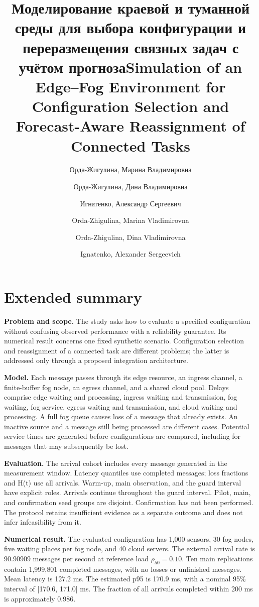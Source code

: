 \documentclass{psta}
\title[Моделирование краевой и туманной среды]{Моделирование краевой и туманной среды для выбора конфигурации и переразмещения связных задач с учётом прогноза}
\author{Орда-Жигулина, Марина Владимировна}
\author{Орда-Жигулина, Дина Владимировна}
\author{Игнатенко, Александр Сергеевич}
\title[Edge--fog simulation and reassignment]{Simulation of an Edge--Fog Environment for Configuration Selection and Forecast-Aware Reassignment of Connected Tasks}
\author{Orda-Zhigulina, Marina Vladimirovna}
\author{Orda-Zhigulina, Dina Vladimirovna}
\author{Ignatenko, Alexander Sergeevich}
\begin{document}
\Russian\maketitle

\raggedbottom
\clearpage\Russian\makeauthorsinfo
\English\maketitle\section*{Extended summary}
\textbf{Problem and scope.} The study asks how to evaluate a specified configuration without confusing observed performance with a reliability guarantee. Its numerical result concerns one fixed synthetic scenario. Configuration selection and reassignment of a connected task are different problems; the latter is addressed only through a proposed integration architecture.

\textbf{Model.} Each message passes through its edge resource, an ingress channel, a finite-buffer fog node, an egress channel, and a shared cloud pool. Delays comprise edge waiting and processing, ingress waiting and transmission, fog waiting, fog service, egress waiting and transmission, and cloud waiting and processing. A full fog queue causes loss of a message that already exists. An inactive source and a message still being processed are different cases. Potential service times are generated before configurations are compared, including for messages that may subsequently be lost.

\textbf{Evaluation.} The arrival cohort includes every message generated in the measurement window. Latency quantiles use completed messages; loss fractions and H(t) use all arrivals. Warm-up, main observation, and the guard interval have explicit roles. Arrivals continue throughout the guard interval. Pilot, main, and confirmation seed groups are disjoint. Confirmation has not been performed. The protocol retains insufficient evidence as a separate outcome and does not infer infeasibility from it.

\textbf{Numerical result.} The evaluated configuration has 1,000 sensors, 30 fog nodes, five waiting places per fog node, and 40 cloud servers. The external arrival rate is 90.90909 messages per second at reference load \(\rho_{50}=0.10\). Ten main replications contain 1,999,801 completed messages, with no losses or unfinished messages. Mean latency is 127.2 ms. The estimated p95 is 170.9 ms, with a nominal 95\% interval of {[}170.6, 171.0{]} ms. The fraction of all arrivals completed within 200 ms is approximately 0.986.
\end{document}
